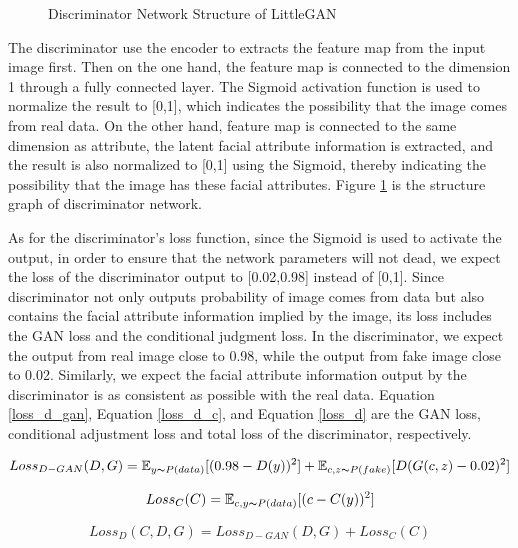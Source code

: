 \begin{figure}
\begin{minipage}[t]{0.48\linewidth}
        \caption{Discriminator Network Structure of LittleGAN}
        \label{net_discriminator}
    \end{minipage}
\end{figure}

The discriminator use the encoder to extracts the feature map from the input image first.
Then on the one hand, the feature map is connected to the dimension 1 through a fully connected layer.
The Sigmoid activation function is used to normalize the result to [0,1],
    which indicates the possibility that the image comes from real data.
On the other hand, feature map is connected to the same dimension as attribute,
    the latent facial attribute information is extracted,
    and the result is also normalized to [0,1] using the Sigmoid,
    thereby indicating the possibility that the image has these facial attributes.
Figure \ref{net_discriminator} is the structure graph of discriminator network.

As for the discriminator's loss function, since the Sigmoid is used to activate the output,
    in order to ensure that the network parameters will not dead,
    we expect the loss of the discriminator output to [0.02,0.98] instead of [0,1].
Since discriminator not only outputs probability of image comes from data but also contains the facial attribute information implied by the image,
    its loss includes the GAN loss and the conditional judgment loss.
In the discriminator, we expect the output from real image close to 0.98, while the output from fake image close to 0.02.
Similarly, we expect the facial attribute information output by the discriminator is as consistent as possible with the real data.
Equation \eqref{loss_d_gan}, Equation \eqref{loss_d_c}, and Equation \eqref{loss_d} are the GAN loss,
    conditional adjustment loss and total loss of the discriminator, respectively.

\begin{equation}
    Loss_{D-GAN}(D,G)=
    \mathbb{E}_{y\thicksim P(data)}[(0.98-D(y))^2]+
    \mathbb{E}_{c,z\thicksim P(fake)}[D(G(c,z)-0.02)^2]
    \label{loss_d_gan}
\end{equation}


\begin{equation}
    Loss_{C}(C)=
    \mathbb{E}_{c,y\thicksim P(data)}[(c-C(y))^2]
    \label{loss_d_c}
\end{equation}

\begin{equation}
    Loss_{D}(C,D,G)=
    Loss_{D-GAN}(D,G)+
    Loss_{C}(C)
    \label{loss_d}
\end{equation}

